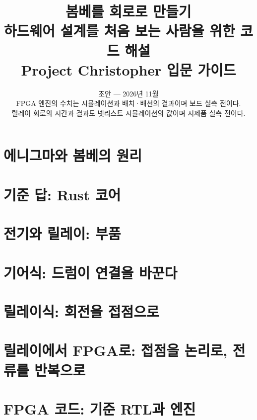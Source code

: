 \documentclass[11pt,a4paper,oneside]{report}
\title{\textbf{봄베를 회로로 만들기}\\[4mm]\Large 하드웨어 설계를 처음 보는 사람을 위한 코드 해설\\[1mm]
  \large Project Christopher 입문 가이드}
\author{}
\date{초안 --- 2026년 11월\\[3mm]
  \normalsize\textcolor{cgray}{FPGA 엔진의 수치는 시뮬레이션과 배치·배선의 결과이며 보드 실측 전이다.\\릴레이 회로의 시간과 결과도 넷리스트 시뮬레이션의 값이며 시제품 실측 전이다.}}
\begin{document}
\maketitle
\tableofcontents



\part{에니그마와 봄베의 원리}





\part{기준 답: Rust 코어}





\part{전기와 릴레이: 부품}




\part{기어식: 드럼이 연결을 바꾼다}


\part{릴레이식: 회전을 접점으로}



\part{릴레이에서 FPGA로: 접점을 논리로, 전류를 반복으로}








\part{FPGA 코드: 기준 RTL과 엔진}




\end{document}
